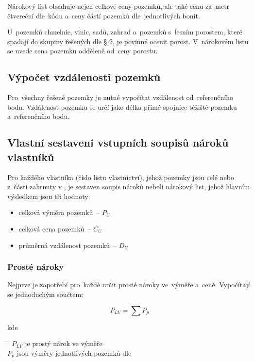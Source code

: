 Nárokový list obsahuje nejen celkové ceny pozemků, ale také cenu
za~metr čtvereční dle~kódu  a~ceny částí pozemků
dle~jednotlivých bonit.

U~pozemků chmelnic, vinic, sadů, zahrad a~pozemků s~lesním porostem, které
spadají do skupiny řešených dle § 2, je povinné ocenit porost. V~nárokovém listu
se uvede cena pozemku odděleně od~ceny porostu.

\subsection{Výpočet vzdálenosti pozemků}
\label{vypocet_vzdalnosti_pozemku}

Pro~všechny řešené pozemky je nutné vypočítat vzdálenost
od~referenčního bodu. Vzdálenost pozemku se určí jako délka přímé
spojnice těžiště pozemku a~referenčního bodu.

\subsection{Vlastní sestavení vstupních soupisů nároků vlastníků}
\label{vlastni_naroky}

Pro každého vlastníka (číslo listu vlastnictví), jehož pozemky jsou celé
nebo z~části zahrnuty v , je sestaven soupis nároků neboli nárokový
list, jehož hlavním výsledkem jsou tři hodnoty:
\vspace{-\topsep}
	\begin{itemize}[leftmargin=1.5cm, noitemsep]
		\item celková výměra pozemků~– $P_{U}$
		\item celková cena pozemků~– $C_{U}$
		\item průměrná vzdálenost pozemků~– $D_{U}$
	\end{itemize}

\subsubsection{Prosté nároky}
\label{proste_naroky}

Nejprve je zapotřebí pro~každé  určit prosté nároky ve~výměře
a~ceně. Vypočítají se jednoduchým součtem:

\begin{equation} P_{LV} = \sum\nolimits P_{p}
\end{equation}

kde
\begin{tabbing} \hspace{2em} \= \hspace{5em} \= \kill \> $P_{LV}$ \>
je prostý nárok ve výměře \\ \> $P_{p}$ \> jsou výměry jednotlivých
pozemků dle 
\end{tabbing}

